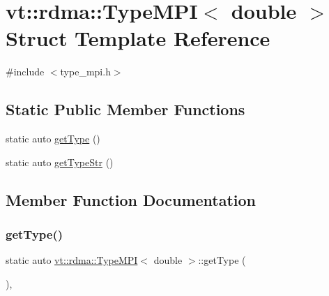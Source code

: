 \hypertarget{structvt_1_1rdma_1_1_type_m_p_i_3_01double_01_4}{}\section{vt\+:\+:rdma\+:\+:Type\+M\+PI$<$ double $>$ Struct Template Reference}
\label{structvt_1_1rdma_1_1_type_m_p_i_3_01double_01_4}


{\ttfamily \#include $<$type\+\_\+mpi.\+h$>$}

\subsection*{Static Public Member Functions}
\begin{DoxyCompactItemize}
\item 
static auto \hyperlink{structvt_1_1rdma_1_1_type_m_p_i_3_01double_01_4_accda76c308d5bb3421d967947ede9e8c}{get\+Type} ()
\item 
static auto \hyperlink{structvt_1_1rdma_1_1_type_m_p_i_3_01double_01_4_aced7c0d92460db64142d050a40159656}{get\+Type\+Str} ()
\end{DoxyCompactItemize}


\subsection{Member Function Documentation}
\mbox{\label{structvt_1_1rdma_1_1_type_m_p_i_3_01double_01_4_accda76c308d5bb3421d967947ede9e8c}} 
\subsubsection{\texorpdfstring{get\+Type()}{getType()}}
{\footnotesize\ttfamily static auto \hyperlink{structvt_1_1rdma_1_1_type_m_p_i}{vt\+::rdma\+::\+Type\+M\+PI}$<$ double $>$\+::get\+Type (\begin{DoxyParamCaption}{ }\end{DoxyParamCaption})\hspace{0.3cm}{\ttfamily [inline]}, {\ttfamily [static]}}

\mbox{\label{structvt_1_1rdma_1_1_type_m_p_i_3_01double_01_4_aced7c0d92460db64142d050a40159656}} 
